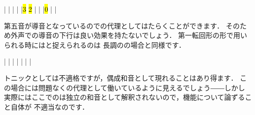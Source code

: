 \documentclass[dvipdfmx,uplatex,b5paper,openany,jbase=12Q,nomag*,textwidth-limit=44%
               ]{gachimuchi}[2020/05/05]
\begin{document}
\begin{floatMusic}[pos=ht]
  \Startpiece%
  \znotes|\en
  \NOTes
  |%
  \en\bar
  \NOTEs
  |%
  \en\doublebar
  \NOTes
  |\hl{3}%
  \hl{2}%
  \en\bar
  \NOTEs
  |%
  \en\doublebar
  \NOTes
  |\hl{0}%
  \en\bar
  \NOTEs
  |%
  \en\setdoublebar
  \endpiece%
\end{floatMusic}

第五音が導音となっているのでの代理としてはたらくことができます．
そのため外声での導音の下行は良い効果を持たないでしょう．
第一転回形の形で用いられる時にはと捉えられるのは
長調の\Gniii\Min の場合と同様です．

\begin{floatMusic}[pos=ht]
  \Startpiece%
  \znotes|\en
  \NOTes
  \zchordsl{\Mdline}%
  |%
  \en\bar
  \NOTes
  \Mryaku\sk%
  |\Mryaku\sk%
  \en\doublebar
  \NOTes
  \zchordsl{\Mdline}%
  |%
  \en\bar
  \NOTes
  \Mryaku\sk%
  |\Mryaku\sk%
  \en\setdoublebar
  \endpiece%
\end{floatMusic}

トニックとしては不適格ですが，偶成和音として現れることはあり得ます．
この場合には問題なくの代理として働いているように見えるでしょう――しかし
実際にはここでの\bFlat\Gniii\Aug は独立の和音として解釈されないので，機能について論ずること自体が
不適当なのです．
\end{document}
